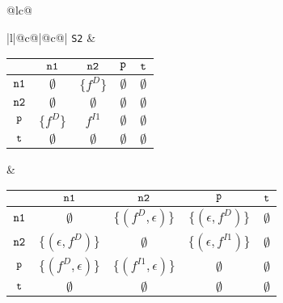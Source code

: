 \documentclass[runningheads,a4paper]{llncs}
\newcommand{\p}{\mbox{\tt p}}
\newcommand{\nO}{\mbox{\tt n1}}
\newcommand{\nT}{\mbox{\tt n2}}
\newcommand{\myt}{\mbox{\tt t}}
\newcommand{\drct}{\ensuremath{D}}
\newcommand{\indrct}{\ensuremath{I}}
\newcommand{\fieldD}[2]{\ensuremath{{#1}_{#2}^\drct}}
\newcommand{\fieldI}[3]{\ensuremath{{#1}_{#2}^{\indrct#3}}}
\begin{document}
\begin{figure}[t]
\begin{tabular}{@{}lc@{}}
{\begin{tabular}[b]{|l|@{}c@{}|@{}c@{}|}
{\tt S2} & 
\begin{tabular}{|c|cccc|} \hline
            & $\nO$  				& $\nT$ 				& $\p$ 			& $\myt$ \\ \hline
  $\nO$ 	& $\emptyset$			& $\{\fieldD{f}{}\}$	& $\emptyset$	& $\emptyset$ \\ \hline
  $\nT$ 	& $\emptyset$			& $\emptyset$			& $\emptyset$	& $\emptyset$ \\ \hline
  $\p$ 		& $\{\fieldD{f}{}\}$	& $\fieldI{f}{}{1}$		& $\emptyset$	& $\emptyset$ \\ \hline
  $\myt$ 	& $\emptyset$			& $\emptyset$			& $\emptyset$	& $\emptyset$ \\ \hline
\end{tabular}
 &
\begin{tabular}{|c|cccc|} \hline
			& $\nO$  						& $\nT$ 							& $\p$ 			& $\myt$ \\ \hline
  $\nO$ 	& $\emptyset$					& $\{(\fieldD{f}{}, \epsilon)\}$		& $\{(\epsilon, \fieldD{f}{})\}$	& $\emptyset$ \\ \hline
  $\nT$ 	& $\{(\epsilon, \fieldD{f}{})\}$					& $\emptyset$		& $\{(\epsilon, \fieldI{f}{}{1})\}$	& $\emptyset$ \\ \hline
  $\p$ 		& $\{(\fieldD{f}{}, \epsilon)\}$& $\{(\fieldI{f}{}{1}, \epsilon)\}$	& $\emptyset$	& $\emptyset$ \\ \hline
  $\myt$ 	& $\emptyset$					& $\emptyset$						& $\emptyset$	& $\emptyset$ \\ \hline
\end{tabular} \\ \hline


\end{tabular}}
\end{tabular}
\end{figure}
\end{document}
